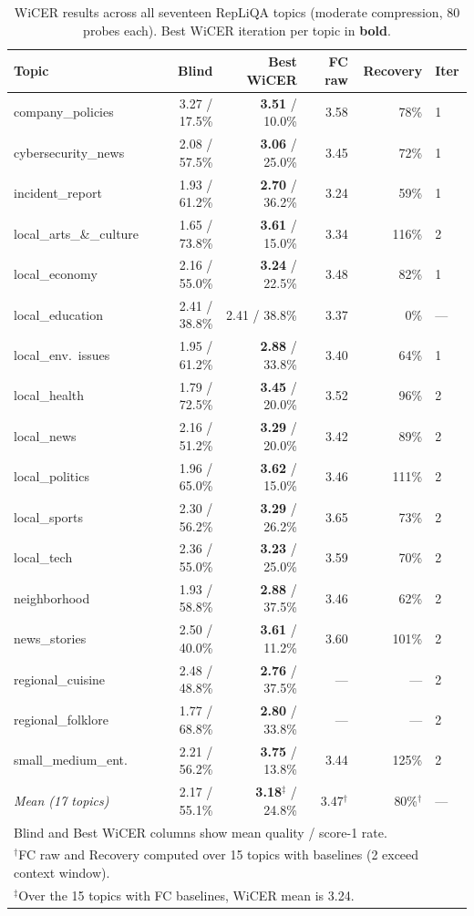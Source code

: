 \documentclass{article}
\begin{document}
\begin{table}[t]
\centering
\caption{WiCER results across all seventeen RepLiQA topics (moderate compression,
80 probes each). Best WiCER iteration per topic in \textbf{bold}.}
\label{tab:wicer}
\small
\begin{tabular}{lrrrrl}
\toprule
\textbf{Topic} & \textbf{Blind} & \textbf{Best WiCER} & \textbf{FC raw} & \textbf{Recovery} & \textbf{Iter} \\
\midrule
company\_policies       & 3.27 / 17.5\% & \textbf{3.51} / 10.0\% & 3.58 & 78\%  & 1 \\
cybersecurity\_news     & 2.08 / 57.5\% & \textbf{3.06} / 25.0\% & 3.45 & 72\%  & 1 \\
incident\_report        & 1.93 / 61.2\% & \textbf{2.70} / 36.2\% & 3.24 & 59\%  & 1 \\
local\_arts\_\&\_culture & 1.65 / 73.8\% & \textbf{3.61} / 15.0\% & 3.34 & 116\% & 2 \\
local\_economy          & 2.16 / 55.0\% & \textbf{3.24} / 22.5\% & 3.48 & 82\%  & 1 \\
local\_education        & 2.41 / 38.8\% & 2.41 / 38.8\%          & 3.37 & 0\%   & --- \\
local\_env.\ issues     & 1.95 / 61.2\% & \textbf{2.88} / 33.8\% & 3.40 & 64\%  & 1 \\
local\_health           & 1.79 / 72.5\% & \textbf{3.45} / 20.0\% & 3.52 & 96\%  & 2 \\
local\_news             & 2.16 / 51.2\% & \textbf{3.29} / 20.0\% & 3.42 & 89\%  & 2 \\
local\_politics         & 1.96 / 65.0\% & \textbf{3.62} / 15.0\% & 3.46 & 111\% & 2 \\
local\_sports           & 2.30 / 56.2\% & \textbf{3.29} / 26.2\% & 3.65 & 73\%  & 2 \\
local\_tech             & 2.36 / 55.0\% & \textbf{3.23} / 25.0\% & 3.59 & 70\%  & 2 \\
neighborhood            & 1.93 / 58.8\% & \textbf{2.88} / 37.5\% & 3.46 & 62\%  & 2 \\
news\_stories           & 2.50 / 40.0\% & \textbf{3.61} / 11.2\% & 3.60 & 101\% & 2 \\
regional\_cuisine       & 2.48 / 48.8\% & \textbf{2.76} / 37.5\% & ---  & ---   & 2 \\
regional\_folklore      & 1.77 / 68.8\% & \textbf{2.80} / 33.8\% & ---  & ---   & 2 \\
small\_medium\_ent.     & 2.21 / 56.2\% & \textbf{3.75} / 13.8\% & 3.44 & 125\% & 2 \\
\midrule
\textit{Mean (17 topics)}
  & 2.17 / 55.1\% & \textbf{3.18}$^\ddagger$ / 24.8\% & 3.47$^\dagger$ & 80\%$^\dagger$ & --- \\
\bottomrule
\multicolumn{6}{l}{\footnotesize Blind and Best WiCER columns show mean quality / score-1 rate.} \\
\multicolumn{6}{l}{\footnotesize $^\dagger$FC raw and Recovery computed over 15 topics with baselines (2 exceed context window).} \\
\multicolumn{6}{l}{\footnotesize $^\ddagger$Over the 15 topics with FC baselines, WiCER mean is 3.24.}
\end{tabular}
\end{table}
\end{document}
